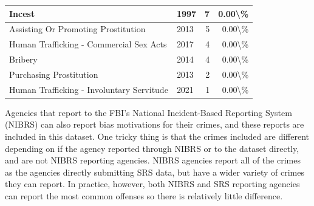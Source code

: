 \documentclass[
]{krantz}
\begin{document}
\begin{longtable}[t]{l|l|r|r}
\hline
Incest & 1997 & 7 & 0.00\textbackslash{}\%\\
\hline
Assisting Or Promoting Prostitution & 2013 & 5 & 0.00\textbackslash{}\%\\
\hline
Human Trafficking - Commercial Sex Acts & 2017 & 4 & 0.00\textbackslash{}\%\\
\hline
Bribery & 2014 & 4 & 0.00\textbackslash{}\%\\
\hline
Purchasing Prostitution & 2013 & 2 & 0.00\textbackslash{}\%\\
\hline
Human Trafficking - Involuntary Servitude & 2021 & 1 & 0.00\textbackslash{}\%\\
\hline
\end{longtable}

Agencies that report to the FBI's National Incident-Based
Reporting System (NIBRS) can also report bias motivations
for their crimes, and these reports are included in this
dataset. One tricky thing is that the crimes included are
different depending on if the agency reported through NIBRS
or to the dataset directly, and are not NIBRS reporting
agencies. NIBRS agencies report all of the crimes as the
agencies directly submitting SRS data, but have a wider
variety of crimes they can report. In practice, however,
both NIBRS and SRS reporting agencies can report the most
common offenses so there is relatively little difference.
\end{document}
